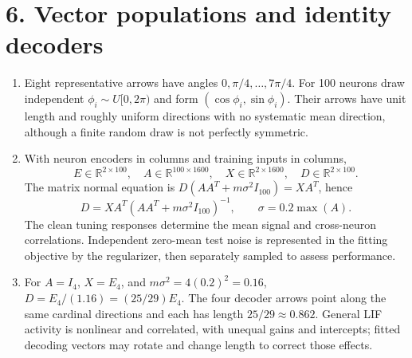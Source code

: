\documentclass[10pt,letterpaper]{article}
\newcommand{\R}{\mathbb{R}}
\begin{document}
\section*{6. Vector populations and identity decoders}
\begin{enumerate}[label=\textbf{6\alph*.}]
\item Eight representative arrows have angles \(0,\pi/4,\ldots,7\pi/4\). For 100 neurons draw independent \(\phi_i\sim U[0,2\pi)\) and form \((\cos\phi_i,\sin\phi_i)\). Their arrows have unit length and roughly uniform directions with no systematic mean direction, although a finite random draw is not perfectly symmetric.
\item With neuron encoders in columns and training inputs in columns,
\[
E\in\R^{2\times100},\quad A\in\R^{100\times1600},\quad
X\in\R^{2\times1600},\quad D\in\R^{2\times100}.
\]
The matrix normal equation is \(D(AA^T+m\sigma^2I_{100})=XA^T\), hence
\[
\boxed{D=XA^T(AA^T+m\sigma^2 I_{100})^{-1}},\qquad \sigma=0.2\max(A).
\]
The clean tuning responses determine the mean signal and cross-neuron correlations. Independent zero-mean test noise is represented in the fitting objective by the regularizer, then separately sampled to assess performance.
\item For \(A=I_4\), \(X=E_4\), and \(m\sigma^2=4(0.2)^2=0.16\),
\(D=E_4/(1.16)=(25/29)E_4\). The four decoder arrows point along the same cardinal directions and each has length \(25/29\approx0.862\). General LIF activity is nonlinear and correlated, with unequal gains and intercepts; fitted decoding vectors may rotate and change length to correct those effects.
\end{enumerate}
\end{document}
